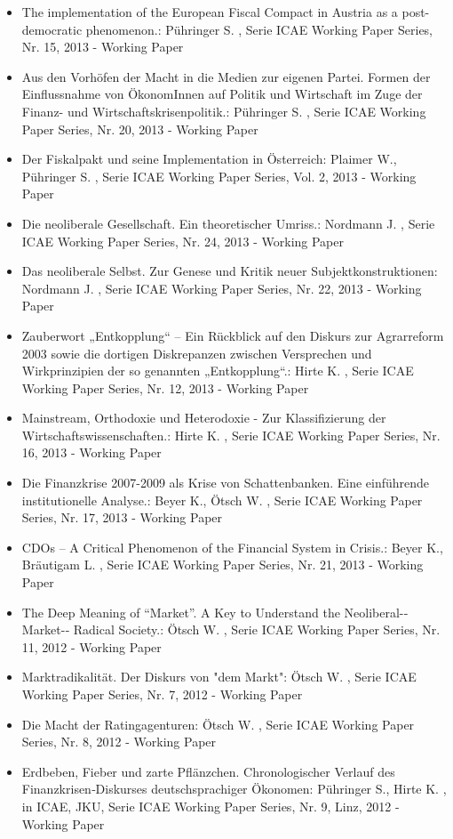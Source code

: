\begin{itemize}
\item The implementation of the European Fiscal Compact in Austria as a post-democratic phenomenon.: Pühringer S. , Serie ICAE Working Paper Series, Nr. 15, 2013 - Working Paper
\item Aus den Vorhöfen der Macht in die Medien zur eigenen Partei. Formen der Einflussnahme von ÖkonomInnen auf Politik und Wirtschaft im Zuge der Finanz-­ und Wirtschaftskrisenpolitik.: Pühringer S. , Serie ICAE Working Paper Series, Nr. 20, 2013 - Working Paper
\item Der Fiskalpakt und seine Implementation in Österreich: Plaimer W., Pühringer S. , Serie ICAE Working Paper Series, Vol. 2, 2013 - Working Paper
\item Die neoliberale Gesellschaft. Ein theoretischer Umriss.: Nordmann J. , Serie ICAE Working Paper Series, Nr. 24, 2013 - Working Paper
\item Das neoliberale Selbst. Zur Genese und Kritik neuer Subjektkonstruktionen: Nordmann J. , Serie ICAE Working Paper Series, Nr. 22, 2013 - Working Paper
\item Zauberwort „Entkopplung“ – Ein Rückblick auf den Diskurs zur Agrarreform 2003 sowie die dortigen Diskrepanzen zwischen Versprechen und Wirkprinzipien der so genannten „Entkopplung“.: Hirte K. , Serie ICAE Working Paper Series, Nr. 12, 2013 - Working Paper
\item Mainstream, Orthodoxie und Heterodoxie - Zur Klassifizierung der Wirtschaftswissenschaften.: Hirte K. , Serie ICAE Working Paper Series, Nr. 16, 2013 - Working Paper
\item Die Finanzkrise 2007-2009 als Krise von Schattenbanken. Eine einführende institutionelle Analyse.: Beyer K., Ötsch W. , Serie ICAE Working Paper Series, Nr. 17, 2013 - Working Paper
\item CDOs – A Critical Phenomenon of the Financial System in Crisis.: Beyer K., Bräutigam L. , Serie ICAE Working Paper Series, Nr. 21, 2013 - Working Paper
\item The Deep Meaning of “Market”. A Key to Understand the Neoliberal-­‐Market-­‐ Radical Society.: Ötsch W. , Serie ICAE Working Paper Series, Nr. 11, 2012 - Working Paper
\item Marktradikalität. Der Diskurs von "dem Markt": Ötsch W. , Serie ICAE Working Paper Series, Nr. 7, 2012 - Working Paper
\item Die Macht der Ratingagenturen: Ötsch W. , Serie ICAE Working Paper Series, Nr. 8, 2012 - Working Paper
\item Erdbeben, Fieber und zarte Pflänzchen. Chronologischer Verlauf des Finanzkrisen‐Diskurses deutschsprachiger Ökonomen: Pühringer S., Hirte K. , in ICAE, JKU, Serie ICAE Working Paper Series, Nr. 9, Linz, 2012 - Working Paper

\end{itemize}
